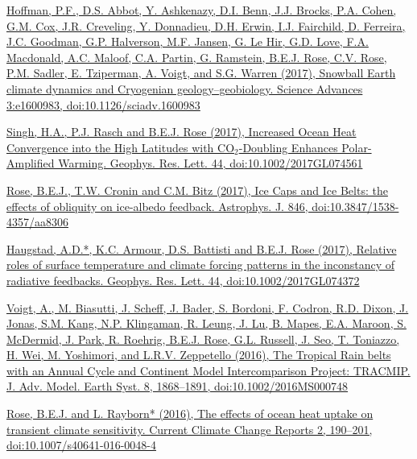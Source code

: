 \documentclass[11pt, letterpaper]{article} %
\newcommand{\years}[1]{\marginnote{\scriptsize #1}} %
\newcommand{\publink}{http://www.atmos.albany.edu/facstaff/brose/resources/Publications/}
\begin{document}
\years{2017} 
\href{http://advances.sciencemag.org/content/3/11/e1600983}{Hoffman, P.F., D.S. Abbot, Y. Ashkenazy, D.I. Benn, J.J. Brocks, P.A. Cohen, G.M. Cox, J.R. Creveling, Y. Donnadieu, D.H. Erwin, I.J. Fairchild, D. Ferreira, J.C. Goodman, G.P. Halverson, M.F. Jansen, G. Le Hir, G.D. Love, F.A. Macdonald, A.C. Maloof, C.A. Partin, G. Ramstein, \underline{B.E.J. Rose}, C.V. Rose, P.M. Sadler, E. Tziperman, A. Voigt, and S.G. Warren (2017), Snowball Earth climate dynamics and Cryogenian geology--geobiology. Science Advances 3:e1600983, doi:10.1126/sciadv.1600983}
\vspace{0.2 cm}

\href{\publink Singh_et_al-2017-Geophysical_Research_Letters-2.pdf}{Singh, H.A., P.J. Rasch and \underline{B.E.J. Rose} (2017), Increased Ocean Heat Convergence into the High Latitudes with CO$_2$-Doubling Enhances Polar-Amplified Warming. Geophys. Res. Lett. 44, doi:10.1002/2017GL074561}
\vspace{0.2 cm}

\href{\publink Rose_2017_ApJ_846_28.pdf}{\underline{Rose, B.E.J.}, T.W. Cronin and C.M. Bitz (2017), Ice Caps and Ice Belts: the effects of obliquity on ice-albedo feedback. Astrophys. J. 846, doi:10.3847/1538-4357/aa8306}
\vspace{0.2 cm}

\href{\publink Haugstad_et_al-2017-Geophysical_Research_Letters.pdf}{Haugstad, A.D.*, K.C. Armour, D.S. Battisti and \underline{B.E.J. Rose} (2017), Relative roles of surface temperature and climate forcing patterns in the inconstancy of radiative feedbacks. Geophys. Res. Lett. 44, doi:10.1002/2017GL074372}
\vspace{0.2 cm}

\years{2016}
\href{\publink Voigt_et_al-2016-TRACMIP.pdf}{Voigt, A., M. Biasutti, J. Scheff, J. Bader, S. Bordoni, F. Codron, R.D. Dixon, J. Jonas, S.M. Kang, N.P. Klingaman, R. Leung, J. Lu, B. Mapes, E.A. Maroon, S. McDermid, J. Park, R. Roehrig, \underline{B.E.J. Rose}, G.L. Russell, J. Seo, T. Toniazzo, H. Wei, M. Yoshimori, and L.R.V. Zeppetello (2016), The Tropical Rain belts with an Annual Cycle and Continent Model Intercomparison Project: TRACMIP. J. Adv. Model. Earth Syst. 8, 1868--1891, doi:10.1002/2016MS000748}
\vspace{0.2 cm}
 
\href{\publink Rose_Rayborn_CCCR2016.pdf}{\underline{Rose, B.E.J.} and L. Rayborn* (2016), The effects of ocean heat uptake on transient climate sensitivity. Current Climate Change Reports 2, 190--201, doi:10.1007/s40641-016-0048-4}
\vspace{0.2 cm}
   
\end{document}
